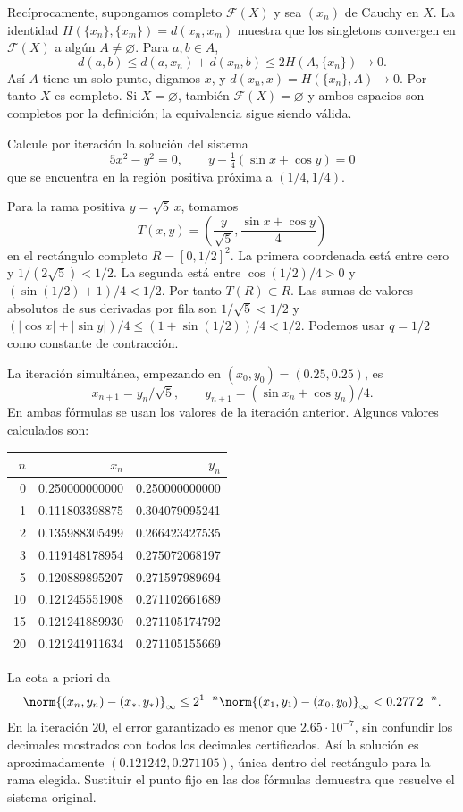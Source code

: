 \begin{solucion}
Recíprocamente, supongamos completo $\mathcal F(X)$ y sea $(x_n)$ de Cauchy en $X$. La identidad $H(\{x_n\},\{x_m\})=d(x_n,x_m)$ muestra que los singletons convergen en $\mathcal F(X)$ a algún $A\ne\varnothing$. Para $a,b\in A$,
\[
 d(a,b)\leq d(a,x_n)+d(x_n,b)\leq2H(A,\{x_n\})\longrightarrow0.
\]
Así $A$ tiene un solo punto, digamos $x$, y $d(x_n,x)=H(\{x_n\},A)\to0$. Por tanto $X$ es completo. Si $X=\varnothing$, también $\mathcal F(X)=\varnothing$ y ambos espacios son completos por la definición; la equivalencia sigue siendo válida.
\end{solucion}

\begin{ejercicio}
Calcule por iteración la solución del sistema
\[
 5x^2-y^2=0,\qquad y-\tfrac14(\sin x+\cos y)=0
\]
que se encuentra en la región positiva próxima a $(1/4,1/4)$.
\end{ejercicio}
\begin{solucion}
Para la rama positiva $y=\sqrt5\,x$, tomamos
\[
 T(x,y)=\left(\frac{y}{\sqrt5},\frac{\sin x+\cos y}{4}\right)
\]
en el rectángulo completo $R=[0,1/2]^2$. La primera coordenada está entre cero y $1/(2\sqrt5)<1/2$. La segunda está entre $\cos(1/2)/4>0$ y $(\sin(1/2)+1)/4<1/2$. Por tanto $T(R)\subset R$. Las sumas de valores absolutos de sus derivadas por fila son $1/\sqrt5<1/2$ y $(|\cos x|+|\sin y|)/4\leq(1+\sin(1/2))/4<1/2$. Podemos usar $q=1/2$ como constante de contracción.

La iteración simultánea, empezando en $(x_0,y_0)=(0.25,0.25)$, es
\[
 x_{n+1}=y_n/\sqrt5,\qquad y_{n+1}=(\sin x_n+\cos y_n)/4.
\]
En ambas fórmulas se usan los valores de la iteración anterior. Algunos valores calculados son:
\begin{center}
\begin{tabular}{rrr}
\toprule
$n$&$x_n$&$y_n$\\\midrule
0&0.250000000000&0.250000000000\\
1&0.111803398875&0.304079095241\\
2&0.135988305499&0.266423427535\\
3&0.119148178954&0.275072068197\\
5&0.120889895207&0.271597989694\\
10&0.121245551908&0.271102661689\\
15&0.121241889930&0.271105174792\\
20&0.121241911634&0.271105155669\\\bottomrule
\end{tabular}
\end{center}
La cota a priori da
\[
 \norm{(x_n,y_n)-(x_*,y_*)}_\infty
 \leq 2^{1-n}\norm{(x_1,y_1)-(x_0,y_0)}_\infty
 <0.277\,2^{-n}.
\]
En la iteración $20$, el error garantizado es menor que $2.65\cdot10^{-7}$, sin confundir los decimales mostrados con todos los decimales certificados. Así la solución es aproximadamente $(0.121242,0.271105)$, única dentro del rectángulo para la rama elegida. Sustituir el punto fijo en las dos fórmulas demuestra que resuelve el sistema original.
\end{solucion}

